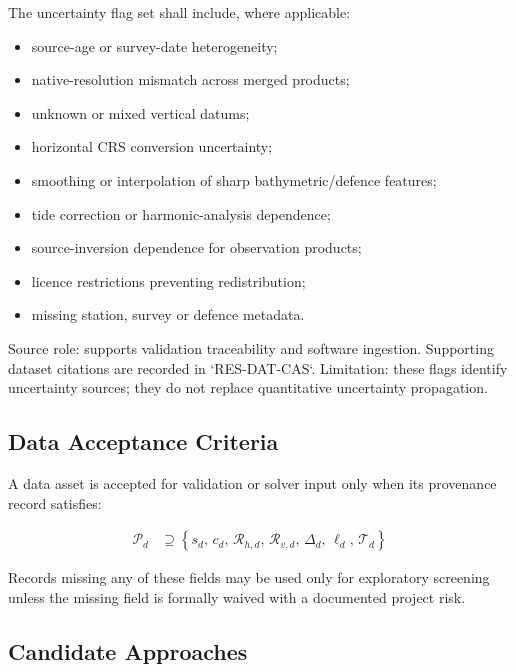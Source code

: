 The uncertainty flag set shall include, where applicable:

\begin{itemize}
  \item source-age or survey-date heterogeneity;
  \item native-resolution mismatch across merged products;
  \item unknown or mixed vertical datums;
  \item horizontal CRS conversion uncertainty;
  \item smoothing or interpolation of sharp bathymetric/defence
    features;
  \item tide correction or harmonic-analysis dependence;
  \item source-inversion dependence for observation products;
  \item licence restrictions preventing redistribution;
  \item missing station, survey or defence metadata.
\end{itemize}

Source role: supports validation traceability and software ingestion.
Supporting dataset citations are recorded in `RES-DAT-CAS`.
Limitation: these flags identify uncertainty sources; they do not
replace quantitative uncertainty propagation.

\subsection{Data Acceptance Criteria}
\label{sec:res-dat-unc-data-acceptance-criteria}

A data asset is accepted for validation or solver input only when its
provenance record satisfies:

\begin{align}
  \mathcal{P}_{d}
  &\supseteq
  \left\{
    s_d,\,
    c_d,\,
    \mathcal{R}_{h,d},\,
    \mathcal{R}_{v,d},\,
    \Delta_d,\,
    \ell_d,\,
    \mathcal{T}_d
  \right\}
  \label{eq:res-dat-unc-minimum-accepted-provenance}
\end{align}

Records missing any of these fields may be used only for exploratory
screening unless the missing field is formally waived with a documented
project risk.

\subsection{Candidate Approaches}
\label{sec:res-dat-unc-candidate-approaches}

